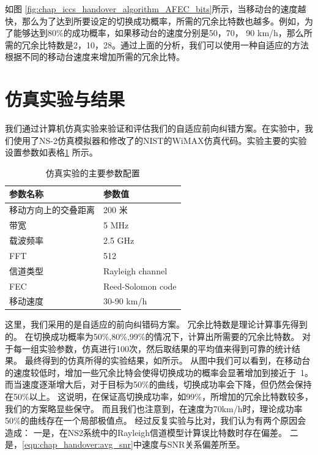 
如图 \ref{fig:chap_iccs_handover_algorithm_AFEC_bits}所示，当移动台的速度越快，那么为了达到所要设定的切换成功概率，所需的冗余比特数也越多。例如，为了能够达到$80\%$的成功概率，如果移动台的速度分别是50，70， 90 km/h，那么所需的冗余比特数是2，10，28。通过上面的分析，我们可以使用一种自适应的方法根据不同的移动台速度来增加所需的冗余比特。

\section{仿真实验与结果}
我们通过计算机仿真实验来验证和评估我们的自适应前向纠错方案。在实验中，我们使用了NS-2仿真模拟器和修改了的NIST的WiMAX仿真代码。实验主要的实验设置参数如表格\ref{chap_iccs_table_I} 所示。

\begin{table}[htbp]
\wuhao
\centering
\caption{仿真实验的主要参数配置}\label{chap_iccs_table_I}
\begin{tabular*}{0.99\textwidth}{p{7cm} p{7cm}} 
\toprule 
参数名称  & 参数值 \\
\midrule
移动方向上的交叠距离  & 200 米\tabularnewline 
带宽  & 5 MHz\tabularnewline 
载波频率  & 2.5 GHz\tabularnewline 
FFT   & 512\tabularnewline
信道类型  & Rayleigh channel\tabularnewline 
FEC  & Reed-Solomon code\tabularnewline 
移动速度  & 30-90 km/h\\
\bottomrule
\end{tabular*}
\end{table}

这里，我们采用的是自适应的前向纠错码方案。
冗余比特数是理论计算事先得到的。
在切换成功概率为50\%,80\%,99\%的情况下，计算出所需要的冗余比特数。
对于每一组实验参数，仿真进行100次，然后取结果的平均值来得到可靠的统计结果。
最终得到的仿真所得的实验结果，如所示。
从图中我们可以看到，在移动台的速度较低时，增加一些冗余比特会使得切换成功的概率会显著增加到接近于~1。
而当速度逐渐增大后，对于目标为50\%的曲线，切换成功率会下降，但仍然会保持在50\%以上。
这说明，在保证高切换成功率，如99\%，所增加的冗余比特数较多，我们的方案略显些保守。
而且我们也注意到，在速度为70km/h时，理论成功率50\%的曲线存在一个局部极值点。
经过反复实验与比对，我们认为有两个原因会造成：
一是，在NS2系统中的Rayleigh信道模型计算误比特数时存在偏差。
二是，\eqref{eqn:chap_handover:avg_snr}中速度与SNR关系偏差所至。

